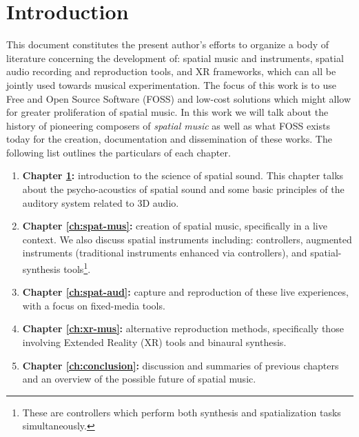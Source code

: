 \chapter{Introduction} \label{ch:intro}

This document constitutes the present author's efforts to organize a body of literature concerning the development of: spatial music and instruments, spatial audio recording and reproduction tools, and XR frameworks, which can all be jointly used towards musical experimentation. The focus of this work is to use Free and Open Source Software (FOSS) and low-cost solutions which might allow for greater proliferation of spatial music. In this work we will talk about the history of pioneering composers of \textit{spatial music} as well as what FOSS exists today for the creation, documentation and dissemination of these works. The following list outlines the particulars of each chapter.

\begin{enumerate}

    \item \textbf{Chapter \ref{ch:intro}:} introduction to the science of spatial sound. This chapter talks about the psycho-acoustics of spatial sound and some basic principles of the auditory system related to 3D audio.
    \item \textbf{Chapter \ref{ch:spat-mus}:} creation of spatial music, specifically in a live context. We also discuss spatial instruments including: controllers, augmented instruments (traditional instruments enhanced via controllers), and spatial-synthesis tools\footnote{These are controllers which perform both synthesis and spatialization tasks simultaneously.}.
    \item \textbf{Chapter \ref{ch:spat-aud}:} capture and reproduction of these live experiences, with a focus on fixed-media tools. 
    \item \textbf{Chapter \ref{ch:xr-mus}:} alternative reproduction methods, specifically those involving Extended Reality (XR) tools and binaural synthesis.
    \item \textbf{Chapter \ref{ch:conclusion}:} discussion and summaries of previous chapters and an overview of the possible future of spatial music.
    
\end{enumerate}


